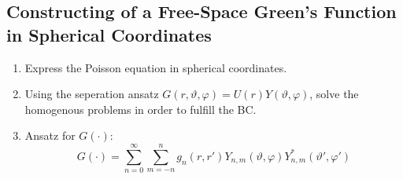 \subsection{Constructing of a Free-Space Green's Function in Spherical Coordinates}
\begin{enumerate}
  \item Express the Poisson equation in spherical coordinates.
  \item Using the seperation ansatz $G(r,\vartheta,\varphi) = U(r)Y(\vartheta,\varphi)$, solve the homogenous problems in order to fulfill the BC.
  \item Ansatz for $G(\cdot)$:
        \begin{equation*}
          G(\cdot) = \sum\limits_{n=0}^{\infty}\sum\limits_{m=-n}^{n}g_{n}(r,r') Y_{n,m}(\vartheta,\varphi) Y_{n,m}^{*}(\vartheta',\varphi')
        \end{equation*}
\end{enumerate}

